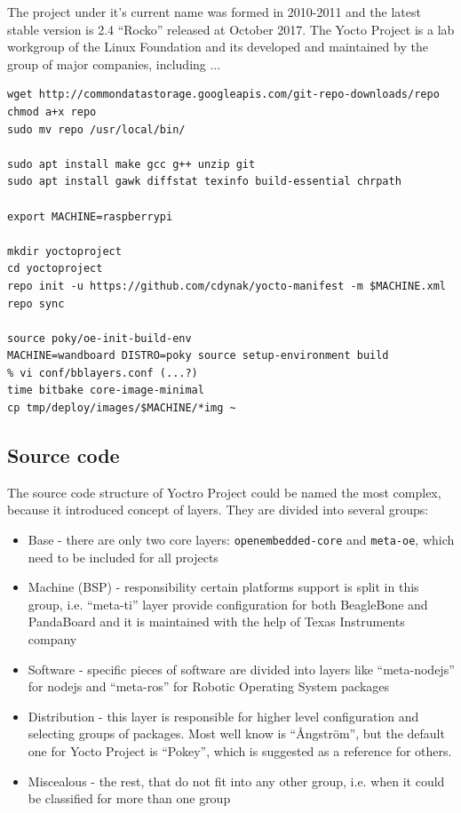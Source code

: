 \documentclass[printmode]{mgr}
\begin{document}
The project under it's current name was formed in 2010-2011 and the latest stable version is 2.4 ``Rocko'' released at October 2017. The Yocto Project is a lab workgroup of the Linux Foundation and its developed and maintained by the group of major companies, including ...







\begin{lstlisting}
wget http://commondatastorage.googleapis.com/git-repo-downloads/repo
chmod a+x repo
sudo mv repo /usr/local/bin/

sudo apt install make gcc g++ unzip git
sudo apt install gawk diffstat texinfo build-essential chrpath

export MACHINE=raspberrypi

mkdir yoctoproject
cd yoctoproject
repo init -u https://github.com/cdynak/yocto-manifest -m $MACHINE.xml
repo sync

source poky/oe-init-build-env
MACHINE=wandboard DISTRO=poky source setup-environment build
% vi conf/bblayers.conf (...?)
time bitbake core-image-minimal
cp tmp/deploy/images/$MACHINE/*img ~
\end{lstlisting}


\subsection*{Source code}

The source code structure of Yoctro Project could be named the most complex, because it introduced concept of layers.
They are divided into several groups:
\begin{itemize}
    \item Base - there are only two core layers: \verb|openembedded-core| and \verb|meta-oe|, which need to be included for all projects
    \item Machine (BSP) - responsibility certain platforms support is split in this group, i.e. ``meta-ti'' layer provide configuration for both BeagleBone and PandaBoard and it is maintained with the help of Texas Instruments company
    \item Software - specific pieces of software are divided into layers like ``meta-nodejs'' for nodejs and ``meta-ros'' for Robotic Operating System packages
    \item Distribution - this layer is responsible for higher level configuration and selecting groups of packages. Most well know is ``Ångström'', but the default one for Yocto Project is ``Pokey'', which is suggested as a reference for others.
    \item Miscealous - the rest, that do not fit into any other group, i.e. when it could be classified for more than one group
\end{itemize}
\end{document}
